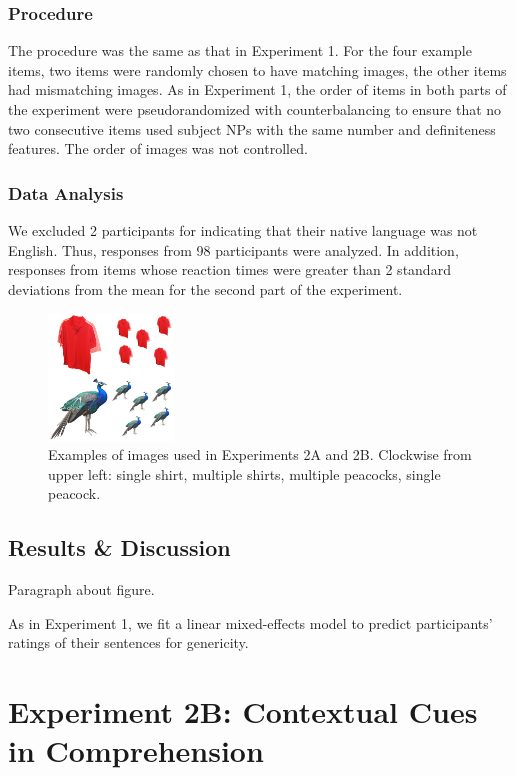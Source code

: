 \documentclass[10pt,letterpaper]{article}
\begin{document}
\subsubsection{Procedure} \quad The procedure was the same as that in Experiment 1. For the four example items, two items were randomly chosen to have matching images, the other items had mismatching images. As in Experiment 1, the order of items in both parts of the experiment were pseudorandomized with counterbalancing to ensure that no two consecutive items used subject NPs with the same number and definiteness features. The order of images was not controlled.

\subsubsection{Data Analysis} \quad We excluded 2 participants for indicating that their native language was not English. Thus, responses from 98 participants were analyzed. In addition, responses from items whose reaction times were greater than 2 standard deviations from the mean for the second part of the experiment.

\begin{figure}[t]
\begin{center}
\includegraphics[width=0.3\textwidth]{sample_images.jpg}
\end{center}
\caption{Examples of images used in Experiments 2A and 2B. Clockwise from upper left: single shirt, multiple shirts, multiple peacocks, single peacock.} 
\label{sample-figure}
\end{figure}

\subsection{Results \& Discussion}

Paragraph about figure.

As in Experiment 1, we fit a linear mixed-effects model to predict participants' ratings of their sentences for genericity.

\section{Experiment 2B: Contextual Cues in Comprehension}
\end{document}
